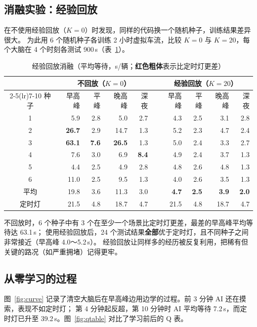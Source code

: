 \documentclass[UTF8,a4paper,zihao=-4,fontset=none]{ctexart}
\newcommand{\red}[1]{\textcolor{bad}{\textbf{#1}}}
\begin{document}
\subsection{消融实验：经验回放}
\label{sec:ablation}
在不使用经验回放（$K=0$）时发现，同样的代码换一个随机种子，训练结果差异很大。
为此用 6 个随机种子各训练 2 小时虚拟车流，比较 $K=0$ 与 $K=20$，每个大脑在 4 个时刻各测试 900\,s（表~\ref{tab:ablation}）。

\begin{table}[h]
\centering\small
\caption{经验回放消融（平均等待，s/辆；\red{红色粗体}表示比定时灯更差）}
\label{tab:ablation}
\setlength{\tabcolsep}{5pt}
\begin{tabular}{c rrrr c rrrr}
\toprule
 & \multicolumn{4}{c}{不回放（$K=0$）} & & \multicolumn{4}{c}{经验回放（$K=20$）}\\
\cmidrule(lr){2-5}\cmidrule(lr){7-10}
种子 & 早高峰 & 平峰 & 晚高峰 & 深夜 & & 早高峰 & 平峰 & 晚高峰 & 深夜\\
\midrule
1 & 5.9 & 2.8 & 5.0 & 2.7 & & 4.3 & 2.5 & 3.1 & 2.8\\
2 & \red{26.7} & 2.9 & 14.7 & 1.3 & & 5.2 & 2.3 & 4.7 & 2.4\\
3 & \red{63.1} & \red{7.6} & \red{26.5} & 1.3 & & 5.0 & 2.4 & 3.3 & 2.7\\
4 & 7.6 & 3.0 & 6.9 & \red{8.4} & & 4.9 & 2.4 & 3.7 & 1.3\\
5 & 4.4 & 2.5 & 4.9 & 2.8 & & 4.8 & 2.6 & 4.8 & 1.3\\
6 & 11.0 & 2.5 & 9.5 & 1.3 & & 4.0 & 2.6 & 3.5 & 1.3\\
\midrule
平均 & 19.8 & 3.6 & 11.3 & 3.0 & & \textbf{4.7} & \textbf{2.5} & \textbf{3.9} & \textbf{2.0}\\
\midrule
定时灯 & 21.5 & 4.8 & 18.7 & 4.7 & & 21.5 & 4.8 & 18.7 & 4.7\\
\bottomrule
\end{tabular}
\end{table}

不回放时，6 个种子中有 3 个在至少一个场景比定时灯更差，最差的早高峰平均等待达 63.1\,s；
使用经验回放后，24 个测试结果\textbf{全部}优于定时灯，且不同种子之间非常接近（早高峰 4.0～5.2\,s）。
经验回放让同样多的经历被反复利用，把稀有但关键的路况（如严重拥堵）记得更牢。

\subsection{从零学习的过程}
图~\ref{fig:curve} 记录了清空大脑后在早高峰边用边学的过程。前 3 分钟 AI 还在摸索，表现不如定时灯；
第 4 分钟起反超，第 10 分钟时 AI 平均等待 7.2\,s，而定时灯已升至 39.2\,s。图~\ref{fig:qtable} 对比了学习前后的 Q 表。
\end{document}
